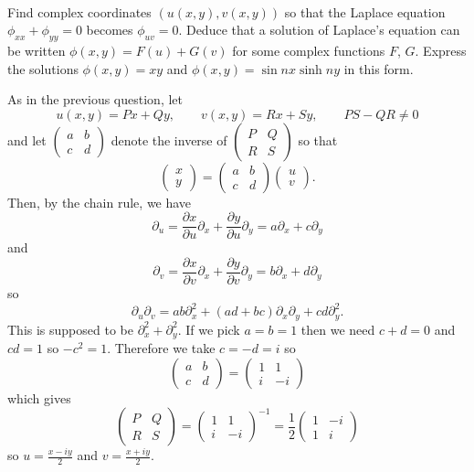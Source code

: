 \documentclass[12pt]{article}
\begin{document}
\bigskip

\begin{question}\ \\
Find complex coordinates $(u(x,y),v(x,y))$ so that the Laplace equation $\phi_{xx}+\phi_{yy}=0$ becomes $\phi_{uv}=0$. Deduce that a solution of Laplace's equation can be written $\phi(x,y)=F(u)+G(v)$ for some complex functions $F$, $G$. Express the solutions $\phi(x,y)=xy$ and $\phi(x,y)=\sin nx\sinh ny$ in this form.
\end{question}

\begin{answer}
As in the previous question, let
\[u(x,y)=Px+Qy,\qquad v(x,y)=Rx+Sy,\qquad PS-QR\neq 0\]
and let $\left(\begin{array}{cc}a & b \\ c & d\end{array}\right)$ denote the inverse of $\left(\begin{array}{cc}P & Q \\ R & S\end{array}\right)$ so that
\[\left(\begin{array}{c}x \\ y \end{array}\right)=\left(\begin{array}{cc}a & b \\ c & d\end{array}\right)\left(\begin{array}{c}u \\ v\end{array}\right).\]
Then, by the chain rule, we have
\[\partial_u=\frac{\partial x}{\partial u}\partial_x+\frac{\partial y}{\partial u}\partial_y=a\partial_x+c\partial_y\]
and
\[\partial_v=\frac{\partial x}{\partial v}\partial_x+\frac{\partial y}{\partial v}\partial_y=b\partial_x+d\partial_y\]
so
\[\partial_u\partial_v=ab\partial_x^2+(ad+bc)\partial_x\partial_y+cd\partial_y^2.\]
This is supposed to be $\partial_x^2+\partial_y^2$. If we pick $a=b=1$ then we need $c+d=0$ and $cd=1$ so $-c^2=1$. Therefore we take $c=-d=i$ so
\[\left(\begin{array}{cc}a & b \\ c & d\end{array}\right)=\left(\begin{array}{cc}1 & 1 \\ i & -i\end{array}\right)\]
which gives
\[\left(\begin{array}{cc}P & Q \\ R & S\end{array}\right)=\left(\begin{array}{cc}1 & 1 \\ i & -i\end{array}\right)^{-1}=\frac{1}{2}\left(\begin{array}{cc}1 & -i \\ 1 & i\end{array}\right)\]
so $u=\frac{x-iy}{2}$ and $v=\frac{x+iy}{2}$.


\end{answer}
\end{document}
